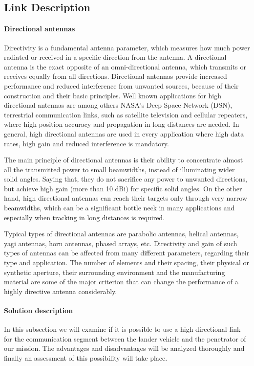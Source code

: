 
\subsection{Link Description}

\paragraph{Directional antennas}
Directivity is a fundamental antenna parameter, which measures how much power radiated or received in a specific direction from the antenna. A directional antenna is the exact opposite of an omni-directional antenna, which transmits or receives equally from all directions. Directional antennas provide increased performance and reduced interference from unwanted sources, because of their construction and their basic principles. Well known applications for high directional antennas are among others NASA's Deep Space Network (DSN), terrestrial communication links, such as satellite television and cellular repeaters, where high position accuracy and propagation in long distances are needed. In general, high directional antennas are used in every application where high data rates, high gain and reduced interference is mandatory.

The main principle of directional antennas is their ability to concentrate almost all the transmitted power to small beamwidths, instead of illuminating wider solid angles. Saying that, they do not sacrifice any power to unwanted directions, but achieve high gain (more than 10 dBi) for specific solid angles. On the other hand, high directional antennas can reach their targets only through very narrow beamwidths, which can be a significant bottle neck in many applications and especially when tracking in long distances is required. 

Typical types of directional antennas are parabolic antennas, helical antennas, yagi antennas, horn antennas, phased arrays, etc. Directivity and gain of such types of antennas can be affected from many different parameters, regarding their type and application. The number of elements and their spacing, their physical or synthetic aperture, their surrounding environment and the manufacturing material are some of the major criterion that can change the performance of a highly directive antenna considerably. 

\paragraph{Solution description}
In this subsection we will examine if it is possible to use a high directional link for the communication segment between the lander vehicle and the penetrator of our mission. The advantages and disadvantages will be analyzed thoroughly and finally an assessment of this possibility will take place. 

